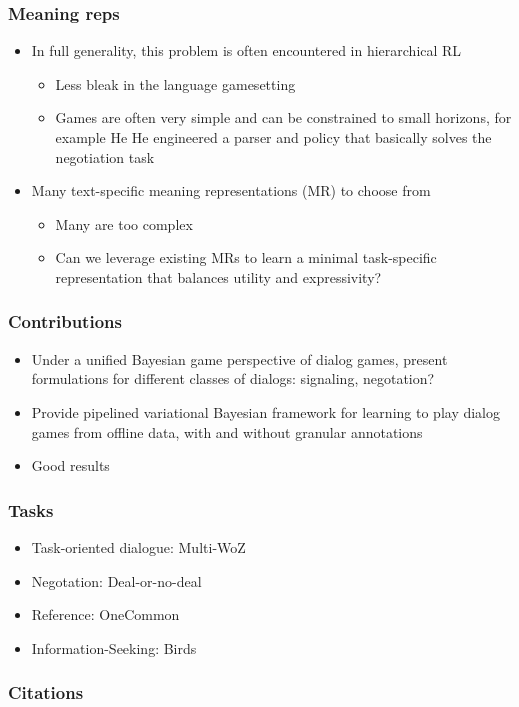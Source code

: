 \documentclass{beamer}
\begin{document}
\begin{frame}
\frametitle{Meaning reps}
\begin{itemize}
\item In full generality, this problem is often encountered in hierarchical RL
    \begin{itemize}
    \item Less bleak in the language gamesetting
    \item Games are often very simple and can be constrained to small horizons,
        for example He He engineered a parser and policy that basically solves
        the negotiation task
    \end{itemize}
\item Many text-specific meaning representations (MR) to choose from
    \begin{itemize}
    \item Many are too complex
    \item Can we leverage existing MRs to learn a minimal task-specific
        representation that balances utility and expressivity?
    \end{itemize}
\end{itemize}
\end{frame}


\begin{frame}
\frametitle{Contributions}
\begin{itemize}
\item Under a unified Bayesian game perspective of dialog games,
    present formulations for different classes of dialogs:
    signaling, negotation?
\item Provide pipelined variational Bayesian framework for learning
    to play dialog games from offline data,
    with and without granular annotations
\item Good results
\end{itemize}
\end{frame}

\begin{frame}
\frametitle{Tasks}
\begin{itemize}
\item Task-oriented dialogue: Multi-WoZ
\item Negotation: Deal-or-no-deal
\item Reference: OneCommon
\item Information-Seeking: Birds
\end{itemize}
\end{frame}

\begin{frame}[allowframebreaks]
\frametitle{Citations}

\end{frame}
\end{document}
